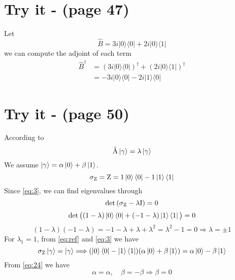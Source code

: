 \documentclass[12pt]{article}
\begin{document}
\section*{Try it - (page 47)}
Let
\begin{equation*}
    \hat{B} = 3i|0\rangle \langle0| + 2i|0\rangle \langle1|
\end{equation*}
we can compute the adjoint of each term 
\begin{align*}
    \hat{B}^{\dagger} &= (3i|0\rangle \langle0|)^{\dagger} + (2i|0\rangle \langle1|)^{\dagger} \\
    &= -3i|0\rangle \langle0| - 2i|1\rangle \langle0|
\end{align*}

\section*{Try it - (page 50)}
According to
\begin{equation}
    \label{eq:ref}
    \hat{\textnormal{A}}\ket{\gamma} = \lambda\ket{\gamma}
\end{equation}
We assume $\ket{\gamma} = \alpha\ket{0}+\beta\ket{1}$.
\begin{equation}
    \label{eq:3}
    \sigma_{\textnormal{Z}} = \textnormal{Z} = 1\ket{0}\bra{0} -1\ket{1}\bra{1}
\end{equation}
Since \ref{eq:3}, we can find eigenvalues through
\begin{equation}
\det{(\sigma_{\textnormal{Z}} - \lambda\textnormal{I})} = 0
\end{equation}
\begin{equation*}
\det{\big((1-\lambda)\ket{0}\bra{0} + (-1-\lambda)\ket{1}\bra{1}\big)} = 0
\end{equation*}
\begin{equation*}
    (1-\lambda)(-1-\lambda) = -1 - \lambda + \lambda + \lambda^2 = \lambda^2 -1 = 0 \Longrightarrow \lambda = \pm 1
\end{equation*}
For $\lambda_1 = 1$, from \ref{eq:ref} and \ref{eq:3} we have
\begin{equation}
    \label{eq:24}
    \sigma_{\textnormal{Z}}\ket{\gamma} = \ket{\gamma} \Longrightarrow (\ket{0}\bra{0} - \ket{1}\bra{1})(\alpha\ket{0}+\beta\ket{1}) = \alpha\ket{0}-\beta\ket{1}
\end{equation}
From \ref{eq:24} we have
\begin{equation}
    \alpha = \alpha, \quad \beta = -\beta \Longrightarrow \beta = 0
\end{equation}
\end{document}
